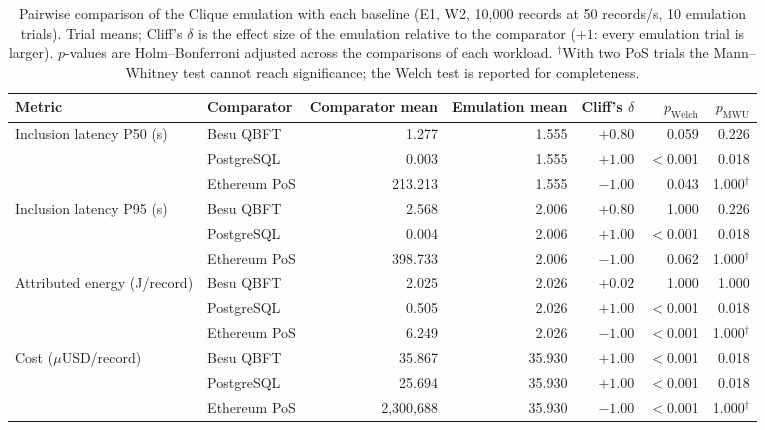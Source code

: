 \begin{table}[t]
\centering
\scriptsize
\caption{Pairwise comparison of the Clique emulation with each baseline (E1, W2, 10{,}000 records at 50 records/s, 10 emulation trials). Trial means; Cliff's $\delta$ is the effect size of the emulation relative to the comparator ($+1$: every emulation trial is larger). $p$-values are Holm--Bonferroni adjusted across the comparisons of each workload. $^{\dagger}$With two PoS trials the Mann--Whitney test cannot reach significance; the Welch test is reported for completeness.}
\label{tab:stats}
\begin{adjustbox}{max width=\textwidth}
\begin{tabular}{llrrrrr}
\toprule
Metric & Comparator & Comparator mean & Emulation mean & Cliff's $\delta$ & $p_{\mathrm{Welch}}$ & $p_{\mathrm{MWU}}$ \\
\midrule
Inclusion latency P50 (s) & Besu QBFT & 1.277 & 1.555 & $+0.80$ & 0.059 & 0.226 \\
 & PostgreSQL & 0.003 & 1.555 & $+1.00$ & $<$0.001 & 0.018 \\
 & Ethereum PoS & 213.213 & 1.555 & $-1.00$ & 0.043 & 1.000$^{\dagger}$ \\
Inclusion latency P95 (s) & Besu QBFT & 2.568 & 2.006 & $+0.80$ & 1.000 & 0.226 \\
 & PostgreSQL & 0.004 & 2.006 & $+1.00$ & $<$0.001 & 0.018 \\
 & Ethereum PoS & 398.733 & 2.006 & $-1.00$ & 0.062 & 1.000$^{\dagger}$ \\
Attributed energy (J/record) & Besu QBFT & 2.025 & 2.026 & $+0.02$ & 1.000 & 1.000 \\
 & PostgreSQL & 0.505 & 2.026 & $+1.00$ & $<$0.001 & 0.018 \\
 & Ethereum PoS & 6.249 & 2.026 & $-1.00$ & $<$0.001 & 1.000$^{\dagger}$ \\
Cost ($\mu$USD/record) & Besu QBFT & 35.867 & 35.930 & $+1.00$ & $<$0.001 & 0.018 \\
 & PostgreSQL & 25.694 & 35.930 & $+1.00$ & $<$0.001 & 0.018 \\
 & Ethereum PoS & 2,300,688 & 35.930 & $-1.00$ & $<$0.001 & 1.000$^{\dagger}$ \\
\bottomrule
\end{tabular}\end{adjustbox}
\end{table}
